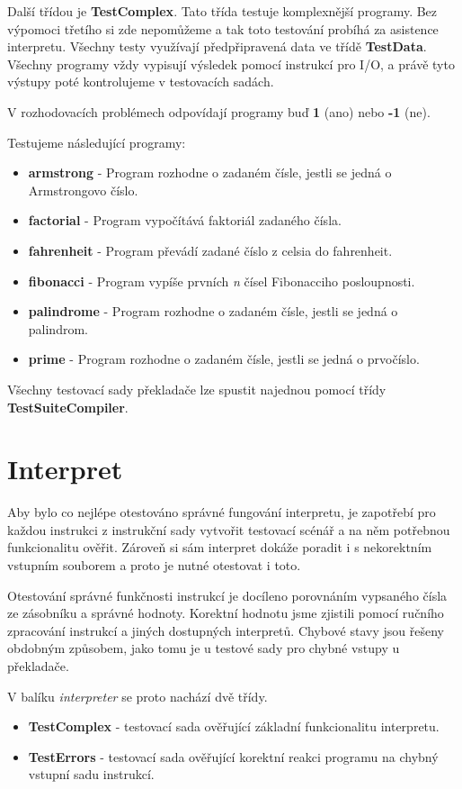 \documentclass[
12pt,
a4paper,
pdftex,
czech,
titlepage
]{report}
\begin{document}
Další třídou je \textbf{TestComplex}. Tato třída testuje komplexnější programy. Bez výpomoci třetího si zde nepomůžeme a tak toto testování probíhá za asistence interpretu. Všechny testy využívají předpřipravená data ve třídě \textbf{TestData}. Všechny programy vždy vypisují výsledek pomocí instrukcí pro I/O, a právě tyto výstupy poté kontrolujeme v testovacích sadách. 

V rozhodovacích problémech odpovídají programy buď \textbf{1} (ano) nebo \textbf{-1} (ne).

Testujeme následující programy:

\begin{itemize}
\item \textbf{armstrong} - Program rozhodne o zadaném čísle, jestli se jedná o Armstrongovo číslo.
\item \textbf{factorial} - Program vypočítává faktoriál zadaného čísla.
\item \textbf{fahrenheit} - Program převádí zadané číslo z celsia do fahrenheit.
\item \textbf{fibonacci} - Program vypíše prvních \textit{n} čísel Fibonacciho posloupnosti.
\item \textbf{palindrome} - Program rozhodne o zadaném čísle, jestli se jedná o palindrom.
\item \textbf{prime} - Program rozhodne o zadaném čísle, jestli se jedná o prvočíslo.
\end{itemize}

Všechny testovací sady překladače lze spustit najednou pomocí třídy \textbf{TestSuiteCompiler}.

\section{Interpret}

Aby bylo co nejlépe otestováno správné fungování interpretu, je zapotřebí pro každou instrukci z instrukční sady vytvořit testovací scénář a na něm potřebnou funkcionalitu ověřit. Zároveň si sám interpret dokáže poradit i s nekorektním vstupním souborem a proto je nutné otestovat i toto.

Otestování správné funkčnosti instrukcí je docíleno porovnáním vypsaného čísla ze zásobníku a správné hodnoty. Korektní hodnotu jsme zjistili pomocí ručního zpracování instrukcí a jiných dostupných interpretů. Chybové stavy jsou řešeny obdobným způsobem, jako tomu je u testové sady pro chybné vstupy u překladače. 

V balíku \textit{interpreter} se proto nachází dvě třídy.
\begin{itemize}
\item \textbf{TestComplex} - testovací sada ověřující základní funkcionalitu interpretu.
\item \textbf{TestErrors} - testovací sada ověřující korektní reakci programu na chybný vstupní sadu instrukcí.
\end{itemize}
\end{document}
